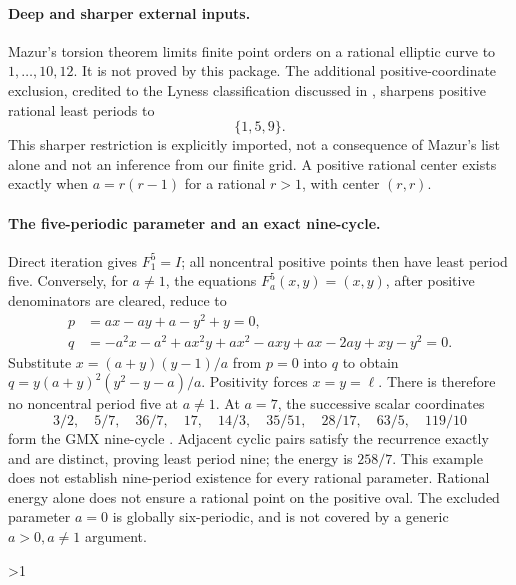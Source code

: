 \documentclass[10pt]{article}
\begin{document}
\paragraph{Deep and sharper external inputs.}
Mazur's torsion theorem \cite{mazur} limits finite point orders on a
rational elliptic curve to $1,\ldots,10,12$. It is not proved by this
package. The additional positive-coordinate exclusion, credited to the
Lyness classification discussed in \cite{gmx}, sharpens positive rational
least periods to
\begin{equation}\label{eq:rational}
 \{1,5,9\}.
\end{equation}
This sharper restriction is explicitly imported, not a consequence
of Mazur's list alone and not an inference from our finite grid.
A positive rational center exists exactly when $a=r(r-1)$ for a rational
$r>1$, with center $(r,r)$.

\paragraph{The five-periodic parameter and an exact nine-cycle.}
Direct iteration gives $F_1^5=I$; all noncentral positive points then have
least period five. Conversely, for $a\ne1$, the equations $F_a^5(x,y)=(x,y)$,
after positive denominators are cleared, reduce to
\begin{align*}
 p&=a x-a y+a-y^2+y=0,\\
 q&=-a^2x-a^2+a x^2y+a x^2-a xy+a x-2ay+xy-y^2=0.
\end{align*}
Substitute $x=(a+y)(y-1)/a$ from $p=0$ into $q$ to obtain
$q=y(a+y)^2(y^2-y-a)/a$. Positivity forces $x=y=\ell$.
There is therefore no noncentral period five at $a\ne1$.
At $a=7$, the successive scalar coordinates
\begin{equation}\label{eq:nine}
 3/2,\quad5/7,\quad36/7,\quad17,\quad14/3,\quad35/51,
 \quad28/17,\quad63/5,\quad119/10
\end{equation}
form the GMX nine-cycle \cite{gmx}. Adjacent cyclic pairs satisfy the
recurrence exactly and are distinct, proving least period nine; the
energy is $258/7$. This example does not establish nine-period existence
for every rational parameter. Rational energy alone does not ensure a
rational point on the positive oval. The excluded parameter $a=0$ is
globally six-periodic, and is not covered by a generic $a>0,a\ne1$ argument.
\fi

\ifnum\CRevisionRound>1
\end{document}
